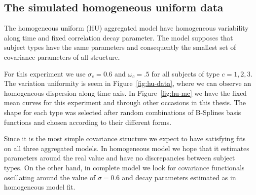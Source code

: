 


\subsection{The simulated homogeneous uniform data}
\label{sec:hu-fit}


The homogeneous uniform (HU) aggregated model have homogeneous variability along time and fixed correlation decay parameter. The model supposes that subject types have the same parameters and consequently the smallest set of covariance parameters of all structure.

For this experiment we use $\sigma_c = 0.6$ and $\omega_c = .5$ for all subjects of type $c = 1,2,3$. The variation uniformity is seem in Figure~\ref{fig:hu-data}, where we can observe an homogeneous dispersion along time axis. In Figure~\ref{fig:hu-mc} we have the fixed mean curves for this experiment and through other occasions in this thesis. The shape for each type was selected after random combinations of B-Splines basis functions and chosen according to their different forms.

Since it is the most simple covariance  structure we expect to have satisfying fits on all three aggregated models. In homogeneous model we hope that it estimates parameters around the  real value and have no discrepancies between subject types. On the other hand, in complete model we look for covariance functionals oscillating around the value of $\sigma = 0.6$ and decay parameters estimated as in homogeneous model fit.




